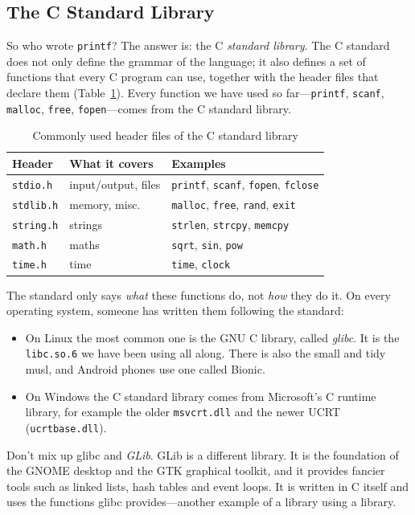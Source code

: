 \subsection{The C Standard Library}

So who wrote \texttt{printf}? The answer is: the C \emph{standard library}. The C standard does not only define the grammar of the language; it also defines a set of functions that every C program can use, together with the header files that declare them (Table~\ref{tab:libc}). Every function we have used so far---\texttt{printf}, \texttt{scanf}, \texttt{malloc}, \texttt{free}, \texttt{fopen}---comes from the C standard library.

\begin{table}[htbp]
  \centering
  \caption{Commonly used header files of the C standard library}
  \label{tab:libc}
  \begin{tabular}{lll}
    \toprule
    Header & What it covers & Examples \\
    \midrule
    \texttt{stdio.h}  & input/output, files & \texttt{printf}, \texttt{scanf}, \texttt{fopen}, \texttt{fclose} \\
    \texttt{stdlib.h} & memory, misc.        & \texttt{malloc}, \texttt{free}, \texttt{rand}, \texttt{exit} \\
    \texttt{string.h} & strings              & \texttt{strlen}, \texttt{strcpy}, \texttt{memcpy} \\
    \texttt{math.h}   & maths                & \texttt{sqrt}, \texttt{sin}, \texttt{pow} \\
    \texttt{time.h}   & time                 & \texttt{time}, \texttt{clock} \\
    \bottomrule
  \end{tabular}
\end{table}

The standard only says \emph{what} these functions do, not \emph{how} they do it. On every operating system, someone has written them following the standard:
\begin{itemize}
  \item On Linux the most common one is the GNU C library, called \emph{glibc}. It is the \texttt{libc.so.6} we have been using all along. There is also the small and tidy musl, and Android phones use one called Bionic.
  \item On Windows the C standard library comes from Microsoft's C runtime library, for example the older \texttt{msvcrt.dll} and the newer UCRT (\texttt{ucrtbase.dll}).
\end{itemize}
Don't mix up glibc and \emph{GLib}. GLib is a different library. It is the foundation of the GNOME desktop and the GTK graphical toolkit, and it provides fancier tools such as linked lists, hash tables and event loops. It is written in C itself and uses the functions glibc provides---another example of a library using a library.

